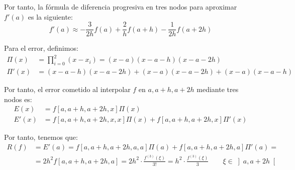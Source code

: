 \begin{ejercicio}
    Por tanto, la fórmula de diferencia progresiva en tres nodos para aproximar $f'(a)$ es la siguiente:
    \[
    f'(a) \approx -\dfrac{3}{2h}f(a) + \dfrac{2}{h}f(a+h) - \dfrac{1}{2h}f(a+2h)
    \]

    Para el error, definimos:
    \begin{align*}
        \Pi(x) &= \prod_{i=0}^{2}(x - x_i) = (x - a)(x - a - h)(x - a - 2h)\\
        \Pi'(x) &= (x-a-h)(x-a-2h) + (x-a)(x-a-2h) + (x-a)(x-a-h)
    \end{align*}

    Por tanto, el error cometido al interpolar $f$ en $a, a+h, a+2h$ mediante tres nodos es:
    \begin{align*}
        E(x) &= f[a, a+h, a+2h, x]\Pi(x)\\
        E'(x) &= f[a, a+h, a+2h, x, x]\Pi(x) + f[a, a+h, a+2h, x]\Pi'(x)
    \end{align*}

    Por tanto, tenemos que:
    \begin{align*}
        R(f) &= E'(a) = f[a, a+h, a+2h, a, a]\Pi(a) + f[a, a+h, a+2h, a]\Pi'(a)
        =\\&= 2h^2f[a, a+h, a+2h, a]=2h^2\cdot \frac{f^{(3)}(\xi)}{3!}=h^2\cdot \frac{f^{(3)}(\xi)}{3}\qquad \xi\in\left]a, a+2h\right[
    \end{align*}
\end{ejercicio}

